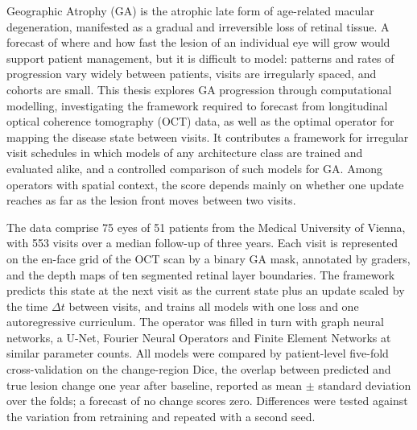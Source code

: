 \begin{abstract*}
Geographic Atrophy (GA) is the atrophic late form of age-related macular
degeneration, manifested as a gradual and irreversible loss of retinal
tissue. A forecast of where and how fast the lesion of an individual eye
will grow would support patient management, but it is difficult to model:
patterns and rates of progression vary widely between patients, visits are
irregularly spaced, and cohorts are small. This thesis explores GA
progression through computational modelling, investigating the framework
required to forecast from longitudinal optical coherence tomography (OCT)
data, as well as the optimal operator for mapping the disease state between
visits. It contributes a framework for irregular visit
schedules in which models of any architecture class are trained and
evaluated alike, and a controlled comparison of such
models for GA. Among operators with spatial context, the score depends
mainly on whether one update reaches as far as the lesion front moves
between two visits.

The data comprise 75 eyes of 51 patients from the Medical University of
Vienna, with 553 visits over a median follow-up of three years. Each visit is represented on the en-face grid of the OCT
scan by a binary GA mask, annotated by graders, and the depth maps of ten
segmented retinal layer boundaries. The framework predicts this state at the
next visit as the current state plus an update scaled by the time
$\Delta t$ between visits, and trains all models with one loss and one
autoregressive curriculum. The operator was filled in turn with graph
neural networks, a U-Net, Fourier Neural Operators and Finite Element
Networks at similar parameter counts. All models were compared by
patient-level five-fold cross-validation on the change-region Dice, the overlap between predicted and true lesion change one
year after baseline, reported as mean $\pm$ standard deviation over the
folds; a forecast of no change scores zero. Differences were tested against
the variation from retraining and repeated with a second seed.


\end{abstract*}
